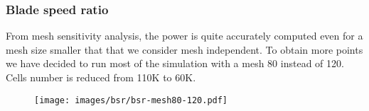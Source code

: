 \documentclass[aspectratio=169]{beamer}
\begin{document}
\begin{frame}
\frametitle{Blade speed ratio}

From mesh sensitivity analysis, the power is quite accurately computed even
for a mesh size smaller that that we consider mesh independent.
To obtain more points we have decided to run most of the simulation with a mesh 80 instead  of 120.
Cells number is reduced from 110K to 60K. 


\begin{figure}[hbtp]
\centering
\texttt{[image: images/bsr/bsr-mesh80-120.pdf]}
\end{figure}

\end{frame}
\end{document}
